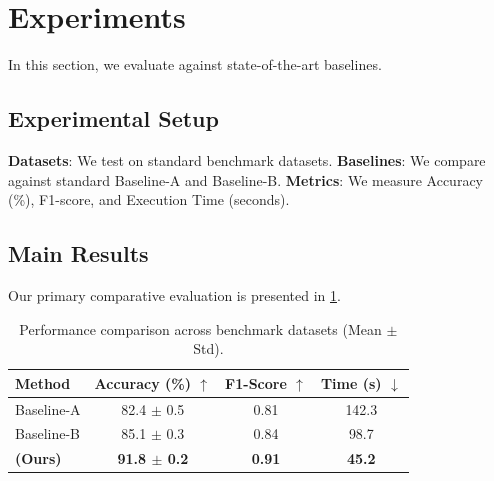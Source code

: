 \section{Experiments}
\label{sec:experiments}

In this section, we evaluate \sister{} against state-of-the-art baselines.

\subsection{Experimental Setup}
\textbf{Datasets}: We test on standard benchmark datasets.
\textbf{Baselines}: We compare against standard Baseline-A and Baseline-B.
\textbf{Metrics}: We measure Accuracy (\%), F1-score, and Execution Time (seconds).

\subsection{Main Results}
Our primary comparative evaluation is presented in \cref{tab:main_results}.

\begin{table}[h]
    \centering
    \caption{Performance comparison across benchmark datasets (Mean $\pm$ Std).}
    \label{tab:main_results}
    \begin{tabular}{lccc}
        \toprule
        \textbf{Method} & \textbf{Accuracy (\%)} $\uparrow$ & \textbf{F1-Score} $\uparrow$ & \textbf{Time (s)} $\downarrow$ \\
        \midrule
        Baseline-A & 82.4 $\pm$ 0.5 & 0.81 & 142.3 \\
        Baseline-B & 85.1 $\pm$ 0.3 & 0.84 & 98.7 \\
        \midrule
        \textbf{\sister{} (Ours)} & \textbf{91.8 $\pm$ 0.2} & \textbf{0.91} & \textbf{45.2} \\
        \bottomrule
    \end{tabular}
\end{table}

